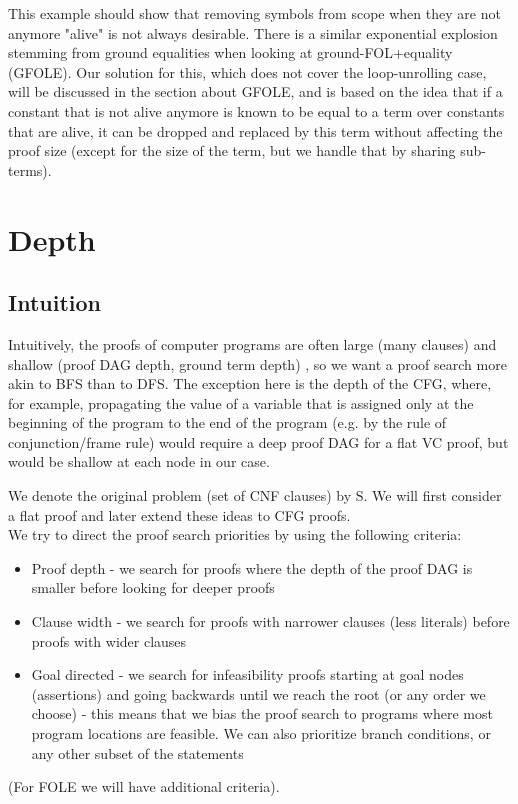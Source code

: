 This example should show that removing symbols from scope when they are not anymore "alive" is not always desirable. 
There is a similar exponential explosion stemming from ground equalities when looking at ground-FOL+equality (GFOLE). 
Our solution for this, which does not cover the loop-unrolling case, will be discussed in the section about GFOLE, and is based on the idea that if a constant that is not alive anymore is known to be equal to a term over constants that are alive, it can be dropped and replaced by this term without affecting the proof size (except for the size of the term, but we handle that by sharing sub-terms).

\newpage
\section{Depth}

\subsection*{Intuition}
Intuitively, the proofs of computer programs are often large (many clauses) and shallow (proof DAG depth, ground term depth) \cite{}, so we want a proof search more akin to BFS than to DFS. The exception here is the depth of the CFG, where, for example, propagating the value of a variable that is assigned only at the beginning of the program to the end of the program (e.g. by the rule of conjunction/frame rule) would require a deep proof DAG for a flat VC proof, but would be shallow at each node in our case.

We denote the original problem (set of CNF clauses) by $\mathrm{S}$. We will first consider a flat proof and later extend these ideas to CFG proofs.\\
We try to direct the proof search priorities by using the following criteria:
\begin{itemize}
	\item Proof depth - we search for proofs where the depth of the proof DAG is smaller before looking for deeper proofs
	\item Clause width - we search for proofs with narrower clauses (less literals) before proofs with wider clauses
	\item Goal directed - we search for infeasibility proofs starting at goal nodes (assertions) and going backwards until we reach the root (or any order we choose) - this means that we bias the proof search to programs where most program locations are feasible. We can also prioritize branch conditions, or any other subset of the statements
\end{itemize}
(For FOLE we will have additional criteria).

